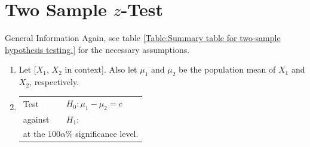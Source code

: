 \section{Two Sample \(z\)-Test}
\begin{stbox}{General Information}
    Again, see table \ref{Table:Summary table for two-sample hypothesis testing.} for the necessary assumptions.
    \begin{enumerate}
      \item Let [\(X_1\), \(X_2\) in context]. Also let \(\mu_1\) and \(\mu_2\) be the population mean of \(X_1\) and \(X_2\), respectively.
      \item 
      \begin{tabular}{|ll|}
        \hline
        Test & \(H_0\colon\mu_1-\mu_2=c\)\\
        against &\(H_1\colon\)
        \begin{enumerate*}[itemjoin={\quad}]
          \item \(\mu_1-\mu_2<c\),
          \item \(\mu_1-\mu_2=c\),\quad or
          \item \(\mu_1-\mu_2>c\),
        \end{enumerate*}\\
        \multicolumn{2}{|l|}{at the \(100\alpha\%\) significance level.}\\

\end{tabular}
\end{enumerate}
\end{stbox}
